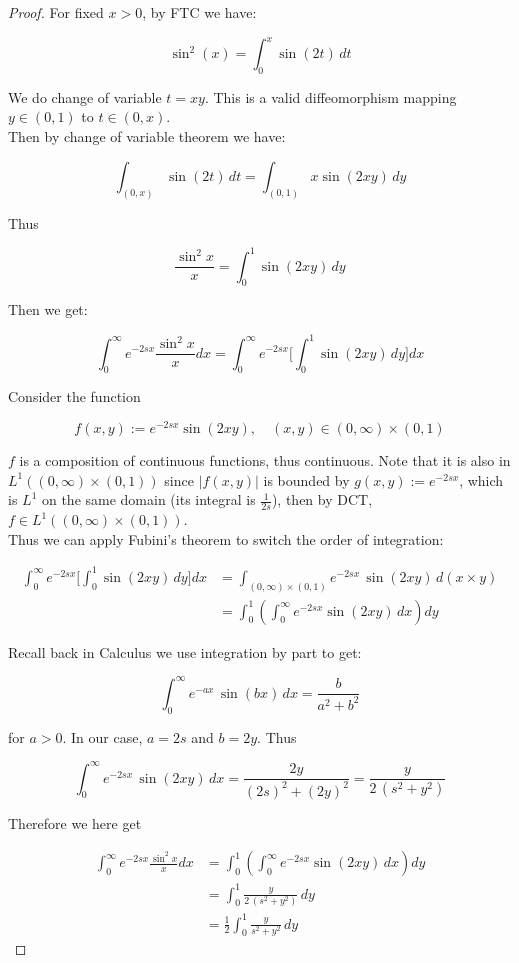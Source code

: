 \begin{proof}

For fixed \(x > 0\), by FTC we have:

\[\sin^{2}(x) = \int_{0}^{x}\sin(2t)\, dt\]

We do change of variable \(t = xy\). This is a valid diffeomorphism mapping \(y \in (0,1)\) to \(t \in (0,x)\).\\
Then by change of variable theorem we have:

\[\int_{(0,x)}\sin(2t)\, dt = \int_{(0,1)}x\sin(2xy)\, dy\]

Thus

\[\frac{\sin^{2}x}{x} = \int_{0}^{1}\sin(2xy)\, dy\]

Then we get:

\[\int_{0}^{\infty}e^{- 2sx}\frac{\sin^{2}x}{x} dx = \int_{0}^{\infty}e^{- 2sx}\lbrack\int_{0}^{1}\sin(2xy)\, dy\rbrack dx\]

Consider the function

\[f(x,y) := e^{- 2sx}\sin(2xy),\quad(x,y) \in (0,\infty) \times (0,1)\]

\(f\) is a composition of continuous functions, thus continuous. Note that it is also in \(L^{1}((0,\infty) \times (0,1))\) since \(|f(x,y)|\) is bounded by \(g(x,y) := e^{- 2sx}\), which is \(L^{1}\) on the same domain (its integral is \(\frac{1}{2s}\)), then by DCT, \(f \in L^{1}((0,\infty) \times (0,1))\).\\
Thus we can apply Fubini's theorem to switch the order of integration:

\[\begin{matrix}
{\int_{0}^{\infty}e^{- 2sx}\lbrack\int_{0}^{1}\sin(2xy)\, dy\rbrack dx} & {= \int_{(0,\infty) \times (0,1)}e^{- 2sx}\,\sin(2xy)\, d(x \times y)} \\
 & {= \int_{0}^{1}(\int_{0}^{\infty}e^{- 2sx}\sin(2xy)\, dx)dy}
\end{matrix}\]

Recall back in Calculus we use integration by part to get:

\[\int_{0}^{\infty}e^{- ax}\,\sin(bx)\, dx = \frac{b}{a^{2} + b^{2}}\]

for \(a > 0\). In our case, \(a = 2s\) and \(b = 2y\). Thus

\[\int_{0}^{\infty}e^{- 2sx}\,\sin(2xy)\, dx = \frac{2y}{(2s)^{2} + (2y)^{2}} = \frac{y}{2\,(s^{2} + y^{2})}\]

Therefore we here get

\[\begin{matrix}
{\int_{0}^{\infty}e^{- 2sx}\frac{\sin^{2}x}{x} dx} & {= \int_{0}^{1}(\int_{0}^{\infty}e^{- 2sx}\sin(2xy)\, dx)dy} \\
 & {= \int_{0}^{1}\frac{y}{2\,(s^{2} + y^{2})}\, dy} \\
 & {= \frac{1}{2}\int_{0}^{1}\frac{y}{s^{2} + y^{2}}\, dy}
\end{matrix}\]


\end{proof}
